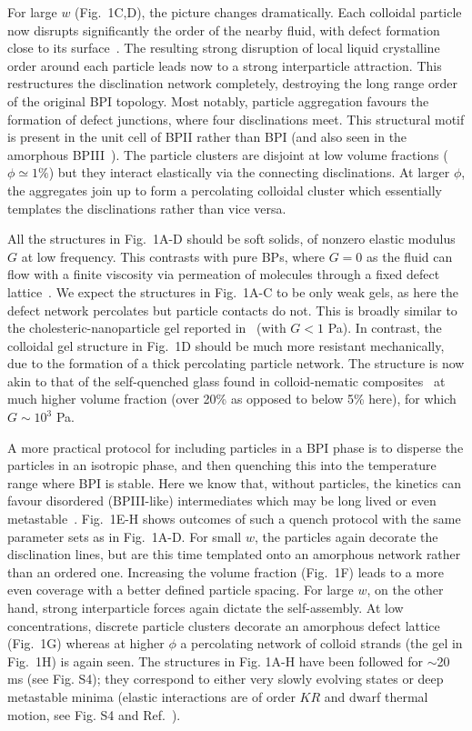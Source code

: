 \documentclass[12pt]{article}
\begin{document}
For large $w$ (Fig.~1C,D), the picture changes dramatically.
Each colloidal particle now disrupts significantly the order of the nearby fluid, with defect formation close to its surface~\cite{stark}. The resulting strong disruption of local liquid crystalline order around each particle leads now to 
a strong interparticle attraction. This restructures the disclination
network completely, destroying the long range order of
the original BPI topology. Most notably, particle aggregation favours
the formation of defect junctions, where four disclinations meet. This structural motif is present in the unit cell of BPII rather than BPI (and also seen in the amorphous BPIII~\cite{bp3}). The particle clusters are disjoint at low volume fractions ($\phi\simeq 1\%$) but they interact elastically via the connecting disclinations. At larger $\phi$, the aggregates join up to form a percolating colloidal cluster which essentially templates the disclinations rather than vice versa. 

All the structures in Fig.~1A-D should be soft solids, of nonzero elastic 
modulus $G$ at low frequency. This contrasts with pure BPs, where
$G=0$ as the fluid can flow with a finite
viscosity via permeation of molecules through a fixed defect lattice~\cite{permeation1,permeation2}. We expect the
structures in Fig.~1A-C to be only weak gels, as here the 
defect network percolates but particle contacts do not. This is broadly similar to the cholesteric-nanoparticle gel reported
in~\cite{lubensky} (with $G<1$ Pa). In contrast, the colloidal gel
structure in Fig.~1D should be much more resistant mechanically, 
due to the formation of a thick percolating particle network. The 
structure is now akin to that of the self-quenched glass found in 
colloid-nematic composites~\cite{tiffany} at much higher volume 
fraction (over 20\% as opposed to below 5\% here), for which $G\sim 10^3$ Pa.

A more practical protocol for including particles in a BPI phase is to disperse the particles in an isotropic phase, and then quenching this into the temperature range where BPI is stable. Here we know that, without particles, the kinetics can favour disordered (BPIII-like) intermediates which may be long lived or even metastable~\cite{domaingrowth}. Fig.~1E-H shows outcomes of such a quench protocol with the same parameter sets as in Fig.~1A-D. For small $w$, the particles again decorate the disclination lines, but are this time templated onto an amorphous network rather than an ordered one.
Increasing the volume fraction (Fig.~1F) leads to a more even coverage with
a better defined particle spacing. 
For large $w$, on the other hand, strong interparticle forces again dictate
the self-assembly. At low concentrations, discrete particle clusters decorate an amorphous defect lattice (Fig.~1G) whereas at higher $\phi$ a percolating network of colloid strands (the gel in Fig.~1H) is again seen. 
The structures in Fig. 1A-H have been followed for $\sim$20 ms 
(see Fig. S4); they correspond to either very slowly evolving states or 
deep metastable minima (elastic interactions are of
order $KR$ and dwarf thermal motion, see
Fig. S4 and Ref.~\cite{stark,lavrentovich}).
\end{document}
